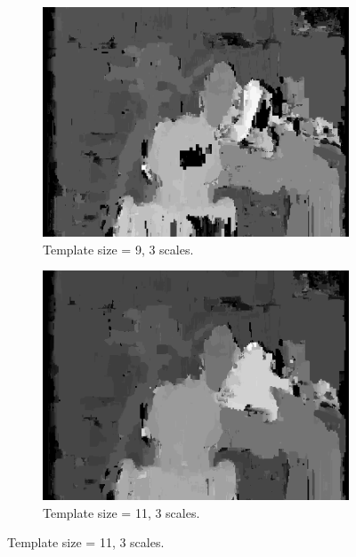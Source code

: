 \documentclass[12pt,a4paper,oneside,final]{article}
\begin{document}
\begin{figure}[H]
\begin{subfigure}[b]{0.24\textwidth}
			\includegraphics[width=\textwidth]{disparity_s3_k9set_1.png}
			\caption{Template size = 9, 3 scales.}
		\end{subfigure}
		\begin{subfigure}[b]{0.24\textwidth}
			\includegraphics[width=\textwidth]{disparity_s3_k11set_1.png}
			\caption{Template size = 11, 3 scales.}
		\end{subfigure}
	\end{figure}
\end{document}
